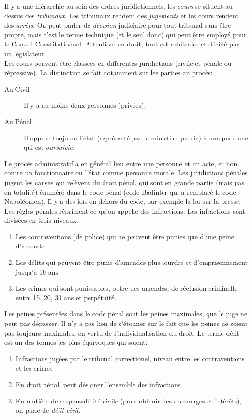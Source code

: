 \documentclass[math]{cours}
\begin{document}
Il y a une hiérarchie au sein des ordres juridictionnels, les \emph{cours} se situent au dessus des \emph{tribunaux}.
Les tribunaux rendent des \emph{jugements} et les cours rendent des \emph{arrêts}.
On peut parler de \emph{décision} judiciaire pour tout tribunal sans être propre, mais c'est le terme technique (et le seul donc) qui peut être employé pour le Conseil Constitutionnel.
Attention: en droit, tout est arbitraire et décidé par un législateur. \\

Les cours peuvent être classées en différentes juridictions (civile et pénale ou répressive).
La distinction se fait notamment sur les parties au procès:
\begin{description}
	\item[Au Civil] Il y a au moins deux personnes (privées).
	\item[Au Pénal] Il oppose toujours l'état (représenté par le ministère public) à une personne qui est \emph{oursuivie}.
\end{description}
Le procès administratif a en général lieu entre une personne et un acte, et non contre un fonctionnaire ou l'état comme personne morale.
Les juridictions pénales jugent les causes qui relèvent du droit pénal, qui sont en grande partie (mais pas en totalité) énuméré dans le code pénal (code Badinter qui a remplacé le code Napoléonien).
Il y a des lois en dehors du code, par exemple la loi sur la presse.
Les règles pénales répriment ce qu'on appelle des infractions.
Les infractions sont divisées en trois niveaux:
\begin{enumerate}
	\item Les contraventions (de police) qui ne peuvent être punies que d'une peine d'amende
	\item Les délits qui peuvent être punis d'amendes plus lourdes et d'emprisonnement jusqu'à 10 ans
	\item Les crimes qui sont punissables, outre des amendes, de réclusion criminelle entre 15, 20, 30 ans et perpétuité.
\end{enumerate}
Les peines présentées dans le code pénal sont les peines maximales, que le juge ne peut pas dépasser.
Il n'y a pas lieu de s'étonner sur le fait que les peines ne soient pas toujours maximales, en vertu de l'individualisation du droit.
Le terme délit est un des termes les plus équivoques qui soient:
\begin{enumerate}
	\item Infractions jugées par le tribunal correctionel, niveau entre les contraventions et les crimes
	\item En droit pénal, peut désigner l'ensemble des infractions
	\item En matière de responsabilité civile (pour obtenir des dommages et intérêts), on parle de \emph{délit civil}.
\end{enumerate}
\end{document}
